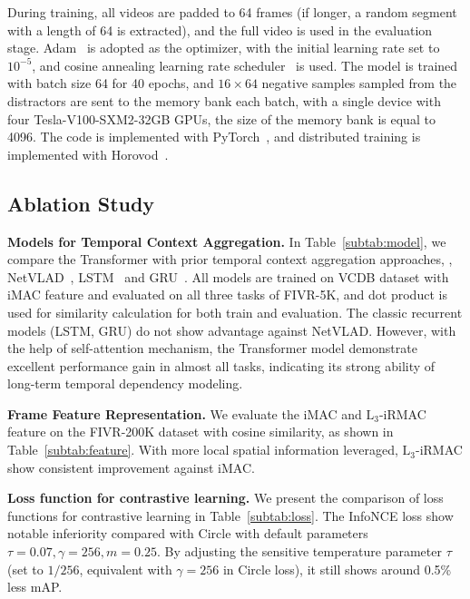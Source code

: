 \documentclass[10pt,twocolumn,letterpaper]{article}
\begin{document}
During training, all videos are padded to 64 frames (if longer, a random segment with a length of 64 is extracted), and the full video is used in the evaluation stage. Adam~\cite{kingma2014adam} is adopted as the optimizer, with the initial learning rate set to $10^{-5}$, and cosine annealing learning rate scheduler~\cite{loshchilov2016sgdr} is used. The model is trained with batch size 64 for 40 epochs, and $16\times64$ negative samples sampled from the distractors are sent to the memory bank each batch, with a single device with four Tesla-V100-SXM2-32GB GPUs, the size of the memory bank is equal to 4096.
The code is implemented with PyTorch~\cite{Paszke2019PyTorchAI}, and distributed training is implemented with Horovod~\cite{Sergeev2018HorovodFA}.

\subsection{Ablation Study} \label{subsection:ablation}

\textbf{Models for Temporal Context Aggregation.}
In Table~\ref{subtab:model}, we compare the Transformer with prior temporal context aggregation approaches, \ie, NetVLAD~\cite{arandjelovic2016netvlad}, LSTM~\cite{hochreiter1997long} and GRU~\cite{cho2014properties}. All models are trained on VCDB dataset with iMAC feature and evaluated on all three tasks of FIVR-5K, and dot product is used for similarity calculation for both train and evaluation. The classic recurrent models (LSTM, GRU) do not show advantage against NetVLAD. However, with the help of self-attention mechanism, the Transformer model demonstrate excellent performance gain in almost all tasks, indicating its strong ability of long-term temporal dependency modeling.

\textbf{Frame Feature Representation.}
We evaluate the iMAC and $\text{L}_3$-iRMAC feature on the FIVR-200K dataset with cosine similarity, as shown in Table~\ref{subtab:feature}. With more local spatial information leveraged, $\text{L}_3$-iRMAC show consistent improvement against iMAC. 

\textbf{Loss function for contrastive learning.}
We present the comparison of loss functions for contrastive learning in Table~\ref{subtab:loss}. The InfoNCE loss show notable inferiority compared with Circle with default parameters $\tau=0.07,\gamma=256,m=0.25$. By adjusting the sensitive temperature parameter $\tau$ (set to $1/256$, equivalent with $\gamma=256$ in Circle loss), it still shows around 0.5\% less mAP.
\end{document}
